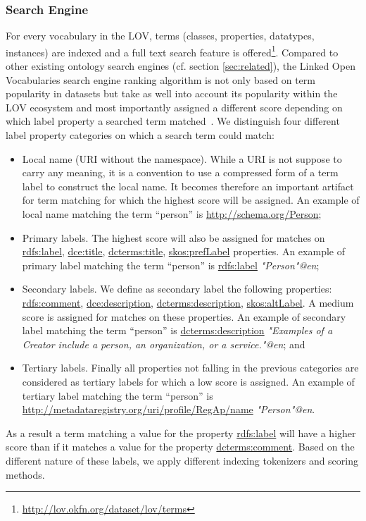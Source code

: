 \documentclass{iosart2c}
\begin{document}
\subsubsection{Search Engine}
For every vocabulary in the LOV, terms (classes, properties, datatypes, instances) are indexed and a full text search feature is offered\footnote{\url{http://lov.okfn.org/dataset/lov/terms}}. Compared to other existing ontology search engines (cf. section \ref{sec:related}), the Linked Open Vocabularies search engine ranking algorithm is not only based on term popularity in datasets but take as well into account its popularity within the LOV ecosystem and most importantly assigned a different score depending on which label property a searched term matched~\cite{butt2014}. We distinguish four different label property categories on which a search term could match: 
		\begin{itemize}
 			\item Local name (URI without the namespace). While a URI is not suppose to carry any meaning, it is a convention to use a compressed form of a term label to construct the local name. It becomes therefore an important artifact for term matching for which the highest score will be assigned. An example of local name matching the term ``person'' is \url{http://schema.org/Person};
			\item Primary labels. The highest score will also be assigned for matches on \url{rdfs:label}, \url{dce:title}, \url{dcterms:title}, \url{skos:prefLabel} properties. An example of primary label matching the term ``person'' is \url{rdfs:label} \emph{"Person"@en};
			\item Secondary labels. We define as secondary label the following properties: \url{rdfs:comment}, \url{dce:description}, \url{dcterms:description}, \url{skos:altLabel}. A medium score is assigned for matches on these properties. An example of secondary label matching the term ``person'' is \url{dcterms:description} \emph{"Examples of a Creator include a person, an organization, or a service."@en}; and
			\item Tertiary labels. Finally all properties not falling in the previous categories are considered as tertiary labels for which a low score is assigned. An example of tertiary label matching the term ``person'' is \url{http://metadataregistry.org/uri/profile/RegAp/name} \emph{"Person"@en}. 
		\end{itemize}
As a result a term matching a value for the property \url{rdfs:label} will have a higher score than if it matches a value for the property \url{dcterms:comment}. Based on the different nature of these labels, we apply different indexing tokenizers and scoring methods.
\end{document}
